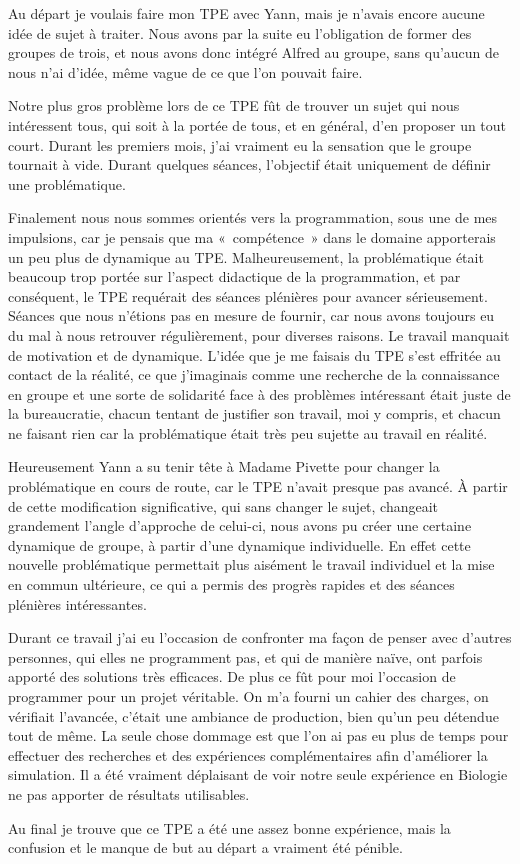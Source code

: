 Au départ je voulais faire mon TPE avec Yann, mais je n'avais encore aucune idée de sujet à traiter. Nous avons par la suite eu l'obligation de former des groupes de trois, et nous avons donc intégré Alfred au groupe, sans qu'aucun de nous n'ai d'idée, même vague de ce que l'on pouvait faire.

Notre plus gros problème lors de ce TPE fût de trouver un sujet qui nous intéressent tous, qui soit à la portée de tous, et en général, d'en proposer un tout court. Durant les premiers mois, j'ai vraiment eu la sensation que le groupe tournait à vide. Durant quelques séances, l'objectif était uniquement de définir une problématique. 

  Finalement nous nous sommes orientés vers la programmation, sous une de mes impulsions, car je pensais que ma «~compétence~» dans le domaine apporterais un peu plus de dynamique au TPE. Malheureusement, la problématique était beaucoup trop portée sur l'aspect didactique de la programmation, et par conséquent, le TPE requérait des séances plénières pour avancer sérieusement. Séances que nous n'étions pas en mesure de fournir, car nous avons toujours eu du mal à nous retrouver régulièrement, pour diverses raisons. Le travail manquait de motivation et de dynamique. L'idée que je me faisais du TPE s'est effritée au contact de la réalité, ce que j'imaginais comme une recherche de la connaissance en groupe et une sorte de solidarité face à des problèmes intéressant était juste de la bureaucratie, chacun tentant de justifier son travail, moi y compris, et chacun ne faisant rien car la problématique était très peu sujette au travail en réalité.
  
  Heureusement Yann a su tenir tête à Madame Pivette pour changer la problématique en cours de route, car le TPE n'avait presque pas avancé. À partir de cette modification significative, qui sans changer le sujet, changeait grandement l'angle d'approche de celui-ci, nous avons pu créer une certaine dynamique de groupe, à partir d'une dynamique individuelle. En effet cette nouvelle problématique permettait plus aisément le travail individuel et la mise en commun ultérieure, ce qui a permis des progrès rapides et des séances plénières intéressantes.
  
  Durant ce travail j'ai eu l'occasion de confronter ma façon de penser avec d'autres personnes, qui elles ne programment pas, et qui de manière naïve, ont parfois apporté des solutions très efficaces. De plus ce fût pour moi l'occasion de programmer pour un projet véritable. On m'a fourni un cahier des charges, on vérifiait l'avancée, c'était une ambiance de production, bien qu'un peu détendue tout de même. La seule chose dommage est que l'on ai pas eu plus de temps pour effectuer des recherches et des expériences complémentaires afin d'améliorer la simulation. Il a été vraiment déplaisant de voir notre seule expérience en Biologie ne pas apporter de résultats utilisables. 
  
  Au final je trouve que ce TPE a été une assez bonne expérience, mais la confusion et le manque de but au départ a vraiment été pénible.
